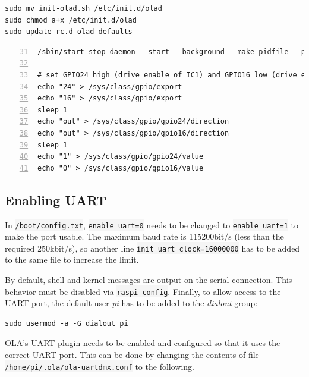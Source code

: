 \begin{lstlisting}[style=myBash]
sudo mv init-olad.sh /etc/init.d/olad
sudo chmod a+x /etc/init.d/olad
sudo update-rc.d olad defaults
\end{lstlisting}

\begin{lstlisting}[numbers=left, style=myBash, firstnumber=31, deletekeywords={umask, exec, export}, caption={[Excerpt from \glsfont{init-olad.sh}]Excerpt from \gls{init-olad.sh}.}, label=lst:init-olad]
/sbin/start-stop-daemon --start --background --make-pidfile --pidfile $PIDFILE --umask 0002 --chuid $USER --exec $DAEMON -- $DAEMON_ARGS

# set GPIO24 high (drive enable of IC1) and GPIO16 low (drive enable of IC2)
echo "24" > /sys/class/gpio/export
echo "16" > /sys/class/gpio/export
sleep 1
echo "out" > /sys/class/gpio/gpio24/direction
echo "out" > /sys/class/gpio/gpio16/direction
sleep 1
echo "1" > /sys/class/gpio/gpio24/value
echo "0" > /sys/class/gpio/gpio16/value
\end{lstlisting}

\vspace{-1.2\baselineskip}

\subsection{Enabling UART}\label{enabling-uart}

In \colorbox{WhiteSmoke}{\lstinline!/boot/config.txt!}, \colorbox{WhiteSmoke}{\lstinline!enable_uart=0!} needs to be
changed to \colorbox{WhiteSmoke}{\lstinline!enable_uart=1!} to make the port usable. The
maximum baud rate is 115200bit/s (less than the required 250kbit/s), so
another line \colorbox{WhiteSmoke}{\lstinline!init_uart_clock=16000000!} has to be added to the
same file to increase the limit.

By default, shell and kernel messages are output on the serial
connection. This behavior must be disabled via \colorbox{WhiteSmoke}{\lstinline!raspi-config!}.
Finally, to allow access to the UART port, the default user \emph{pi}
has to be added to the \emph{dialout} group:

\begin{lstlisting}[style=myBash]
sudo usermod -a -G dialout pi
\end{lstlisting}

OLA's UART plugin needs to be enabled and configured so that it uses the
correct UART port. This can be done by changing the contents of file
\colorbox{WhiteSmoke}{\lstinline!/home/pi/.ola/ola-uartdmx.conf!} to the following.

